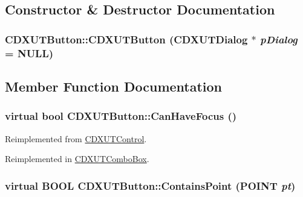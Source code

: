 \subsection{Constructor \& Destructor Documentation}
\hypertarget{class_c_d_x_u_t_button_a05e8d838ea4ce93b2a7c70e78d41a95a}{
\subsubsection[{CDXUTButton}]{\setlength{\rightskip}{0pt plus 5cm}CDXUTButton::CDXUTButton ({\bf CDXUTDialog} $\ast$ {\em pDialog} = {\ttfamily NULL})}}
\label{class_c_d_x_u_t_button_a05e8d838ea4ce93b2a7c70e78d41a95a}


\subsection{Member Function Documentation}
\hypertarget{class_c_d_x_u_t_button_a81d210561344736cca99976a8c8e6d57}{
\subsubsection[{CanHaveFocus}]{\setlength{\rightskip}{0pt plus 5cm}virtual bool CDXUTButton::CanHaveFocus ()}}
\label{class_c_d_x_u_t_button_a81d210561344736cca99976a8c8e6d57}


Reimplemented from \hyperlink{class_c_d_x_u_t_control_a5b2c6c474236a79b257c86caded9c0b7}{CDXUTControl}.

Reimplemented in \hyperlink{class_c_d_x_u_t_combo_box_a274c5f85816abf1d040ea1606bd3447c}{CDXUTComboBox}.\hypertarget{class_c_d_x_u_t_button_a2209ea24f5ba76d7506b368c80940172}{
\subsubsection[{ContainsPoint}]{\setlength{\rightskip}{0pt plus 5cm}virtual BOOL CDXUTButton::ContainsPoint (POINT {\em pt})}}
\label{class_c_d_x_u_t_button_a2209ea24f5ba76d7506b368c80940172}


